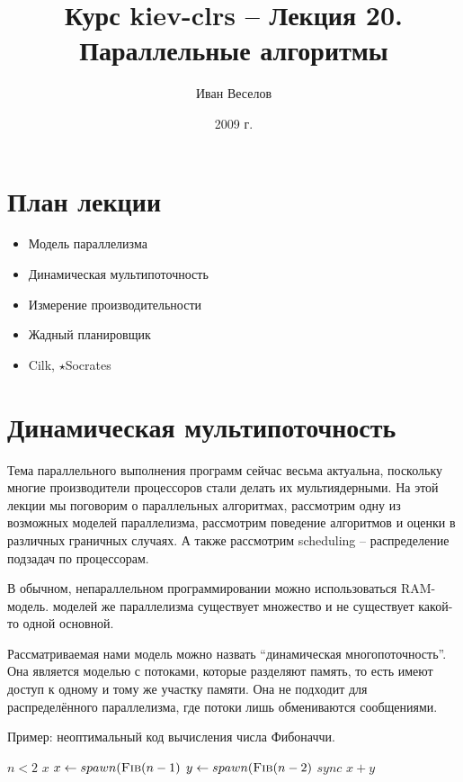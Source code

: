 \documentclass[a4paper,11pt]{article}
\author{Иван Веселов}
\title{Курс kiev-clrs -- Лекция 20. Параллельные алгоритмы}
\date{2009 г.}
\begin{document}
\maketitle
\tableofcontents
\newpage

\setlength{\parskip}{1ex plus 0.5ex minus 0.2ex}

\section{План лекции}
\begin{itemize}
\item Модель параллелизма
\item Динамическая мультипоточность
\item Измерение производительности
\item Жадный планировщик
\item Cilk, $\star$Socrates
\end{itemize}

\section{Динамическая мультипоточность}

Тема параллельного выполнения программ сейчас весьма актуальна, поскольку многие
производители процессоров стали делать их мультиядерными. На этой лекции мы
поговорим о параллельных алгоритмах, рассмотрим одну из возможных моделей
параллелизма, рассмотрим поведение алгоритмов и оценки в различных граничных
случаях. А также рассмотрим scheduling -- распределение подзадач по процессорам.

В обычном, непараллельном программировании можно использоваться RAM-модель.
моделей же параллелизма существует множество и не существует какой-то одной
основной.

Рассматриваемая нами модель можно назвать ``динамическая многопоточность''. Она
является моделью с потоками, которые разделяют память, то есть имеют доступ к
одному и тому же участку памяти. Она не подходит для распределённого
параллелизма, где потоки лишь обмениваются сообщениями.

Пример: неоптимальный код вычисления числа Фибоначчи.

\begin{codebox}
\li \If $n < 2$
\li \Then \Return $x$
\li $x \gets spawn(\textnormal{\scshape Fib}(n-1)$
\li $y \gets spawn(\textnormal{\scshape Fib}(n-2)$
\li $sync$
\li \Return $x+y$
\li \End
\end{codebox}
\end{document}
